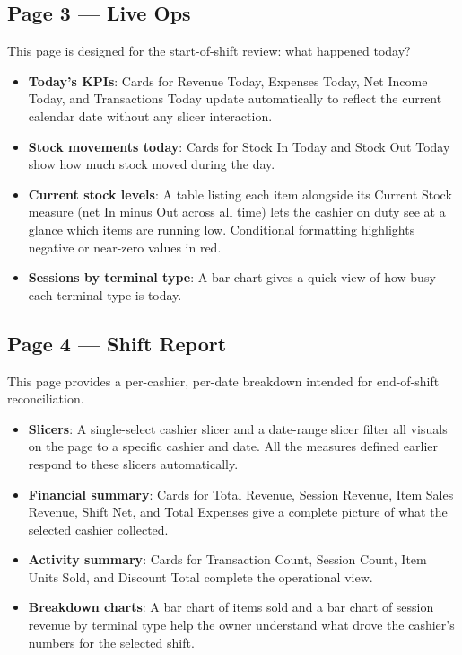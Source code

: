\subsection{Page 3 — Live Ops}

This page is designed for the start-of-shift review: what happened today?

\begin{itemize}
  \item \textbf{Today's KPIs}: Cards for Revenue Today, Expenses Today, Net Income
        Today, and Transactions Today update automatically to reflect the current
        calendar date without any slicer interaction.
  \item \textbf{Stock movements today}: Cards for Stock In Today and Stock Out
        Today show how much stock moved during the day.
  \item \textbf{Current stock levels}: A table listing each item alongside its
        Current Stock measure (net In minus Out across all time) lets the cashier
        on duty see at a glance which items are running low. Conditional formatting
        highlights negative or near-zero values in red.
  \item \textbf{Sessions by terminal type}: A bar chart gives a quick view of how
        busy each terminal type is today.
\end{itemize}

\subsection{Page 4 — Shift Report}

This page provides a per-cashier, per-date breakdown intended for end-of-shift
reconciliation.

\begin{itemize}
  \item \textbf{Slicers}: A single-select cashier slicer and a date-range slicer
        filter all visuals on the page to a specific cashier and date. All the
        measures defined earlier respond to these slicers automatically.
  \item \textbf{Financial summary}: Cards for Total Revenue, Session Revenue, Item
        Sales Revenue, Shift Net, and Total Expenses give a complete picture of what
        the selected cashier collected.
  \item \textbf{Activity summary}: Cards for Transaction Count, Session Count, Item
        Units Sold, and Discount Total complete the operational view.
  \item \textbf{Breakdown charts}: A bar chart of items sold and a bar chart of
        session revenue by terminal type help the owner understand what drove the
        cashier's numbers for the selected shift.
\end{itemize}

